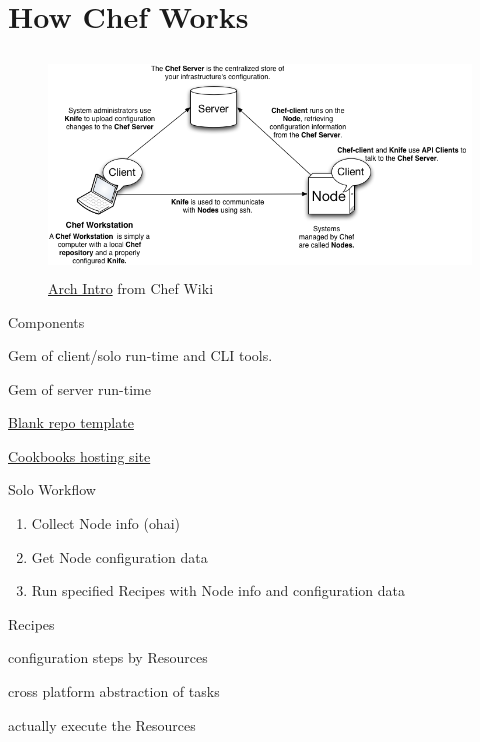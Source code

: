 \documentclass[xetex,mathserif,serif,12pt]{beamer}
\begin{document}
\section{How Chef Works}
\label{sec:how-work}

\begin{frame}
  \begin{figure}
    \centering
    \includegraphics[height=5.8cm]{chef-basics-nwc}
    \caption{\href{http://wiki.opscode.com/display/chef/Architecture+Introduction}{Arch Intro} from Chef Wiki}
    \label{fig:chefsi}
  \end{figure}
\end{frame}

\begin{frame}{Components}
  \begin{description}[<+->]
  \item[chef] Gem of client/solo run-time and CLI tools.
  \item[chef-server] Gem of server run-time
  \item[Chef Repo] \href{https://github.com/opscode/chef-repo}{Blank repo template}
  \item[Community] \href{http://community.opscode.com/}{Cookbooks hosting site}
  \end{description}
\end{frame}

\begin{frame}{Solo Workflow}
  \begin{enumerate}[<+->]
  \item Collect \alert{Node} info (\alert{ohai})
  \item Get \alert{Node} configuration data
  \item Run specified \alert{Recipes} with \alert{Node} info and configuration data
  \end{enumerate}
\end{frame}

\begin{frame}{Recipes}
  \begin{description}[<+->]
  \item[Recipes] configuration steps by \alert{Resources}
  \item[Resources] cross platform abstraction of tasks
  \item[Providers] actually execute the Resources
  \end{description}
\end{frame}
\end{document}
